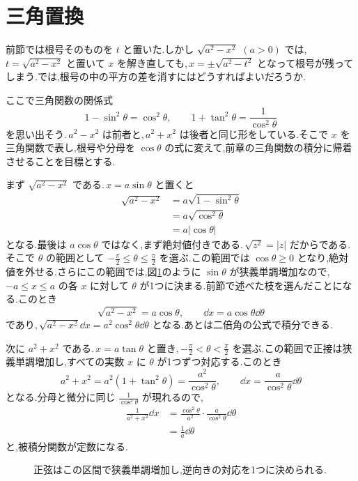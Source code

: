\section{三角置換}\label{節:三角置換の初歩}

前節では根号そのものを $t$ と置いた.しかし $\sqrt{a^2-x^2}$ $(a>0)$ では,\,$t=\sqrt{a^2-x^2}$ と置いて $x$ を解き直しても,\,$x=\pm\sqrt{a^2-t^2}$ となって根号が残ってしまう.では,根号の中の平方の差を消すにはどうすればよいだろうか.

ここで三角関数の関係式
\[
 1-\sin^2\theta=\cos^2\theta,\qquad
 1+\tan^2\theta=\frac1{\cos^2\theta}
\]
を思い出そう.\,$a^2-x^2$ は前者と,\,$a^2+x^2$ は後者と同じ形をしている.そこで $x$ を三角関数で表し,根号や分母を $\cos\theta$ の式に変えて,前章の三角関数の積分に帰着させることを目標とする.

まず $\sqrt{a^2-x^2}$ である.\,$x=a\sin\theta$ と置くと
\begin{align*}
 \sqrt{a^2-x^2}
 &=a\sqrt{1-\sin^2\theta}\\
 &=a\sqrt{\cos^2\theta}\\
 &=a|\cos\theta|
\end{align*}
となる.最後は $a\cos\theta$ ではなく,まず絶対値付きである.\,$\sqrt{z^2}=|z|$ だからである.そこで $\theta$ の範囲として $-\frac\pi2\le\theta\le\frac\pi2$ を選ぶ.この範囲では $\cos\theta\ge0$ となり,絶対値を外せる.さらにこの範囲では,図\ref{図:正弦の枝}のように $\sin\theta$ が狭義単調増加なので,\,$-a\le x\le a$ の各 $x$ に対して $\theta$ が1つに決まる.前節で述べた枝を選んだことになる.このとき
\[
 \sqrt{a^2-x^2}=a\cos\theta,\qquad
 \dd x=a\cos\theta\dd\theta
\]
であり,\,$\sqrt{a^2-x^2}\dd x=a^2\cos^2\theta\dd\theta$ となる.あとは二倍角の公式で積分できる.

次に $a^2+x^2$ である.\,$x=a\tan\theta$ と置き,\,$-\frac\pi2<\theta<\frac\pi2$ を選ぶ.この範囲で正接は狭義単調増加し,すべての実数 $x$ に $\theta$ が1つずつ対応する.このとき
\[
 a^2+x^2=a^2(1+\tan^2\theta)=\frac{a^2}{\cos^2\theta},\qquad
 \dd x=\frac a{\cos^2\theta}\dd\theta
\]
となる.分母と微分に同じ $\frac1{\cos^2\theta}$ が現れるので,
\begin{align*}
 \frac1{a^2+x^2}\dd x
 &=\frac{\cos^2\theta}{a^2}\cdot\frac a{\cos^2\theta}\dd\theta\\
 &=\frac1a\dd\theta
\end{align*}
と,被積分関数が定数になる.

\begin{figure}[htbp]
 \centering
 \caption{正弦はこの区間で狭義単調増加し,逆向きの対応を1つに決められる.}
 \label{図:正弦の枝}
\end{figure}

